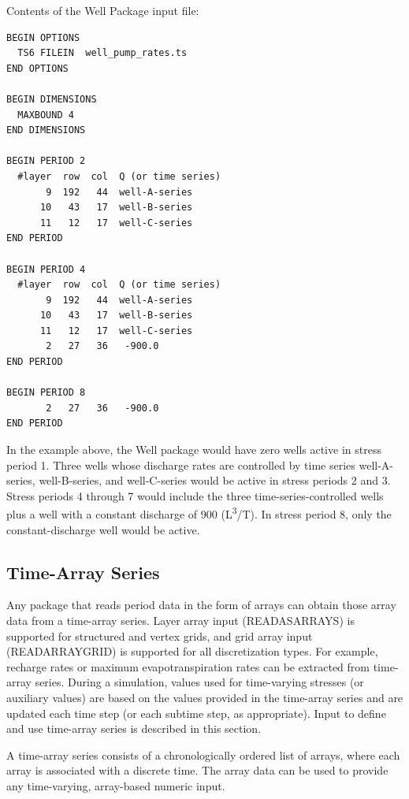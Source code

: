 Contents of the Well Package input file:
\begin{lstlisting}[style=inputfile]
BEGIN OPTIONS
  TS6 FILEIN  well_pump_rates.ts
END OPTIONS

BEGIN DIMENSIONS
  MAXBOUND 4
END DIMENSIONS

BEGIN PERIOD 2
  #layer  row  col  Q (or time series)
       9  192   44  well-A-series
      10   43   17  well-B-series
      11   12   17  well-C-series     
END PERIOD

BEGIN PERIOD 4
  #layer  row  col  Q (or time series)
       9  192   44  well-A-series
      10   43   17  well-B-series
      11   12   17  well-C-series     
       2   27   36   -900.0
END PERIOD

BEGIN PERIOD 8
       2   27   36   -900.0
END PERIOD
\end{lstlisting}

In the example above, the Well package would have zero wells active in stress period 1. Three wells whose discharge rates are controlled by time series well-A-series, well-B-series, and well-C-series would be active in stress periods 2 and 3. Stress periods 4 through 7 would include the three time-series-controlled wells plus a well with a constant discharge of 900 (L\textsuperscript{3}/T). In stress period 8, only the constant-discharge well would be active.

\subsection{Time-Array Series}

Any package that reads period data in the form of arrays can obtain those array data from a time-array series. Layer array input (READASARRAYS) is supported for structured and vertex grids, and grid array input (READARRAYGRID) is supported for all discretization types. For example, recharge rates or maximum evapotranspiration rates can be extracted from time-array series. During a simulation, values used for time-varying stresses (or auxiliary values) are based on the values provided in the time-array series and are updated each time step (or each subtime step, as appropriate). Input to define and use time-array series is described in this section.

A time-array series consists of a chronologically ordered list of arrays, where each array is associated with a discrete time. The array data can be used to provide any time-varying, array-based numeric input.

